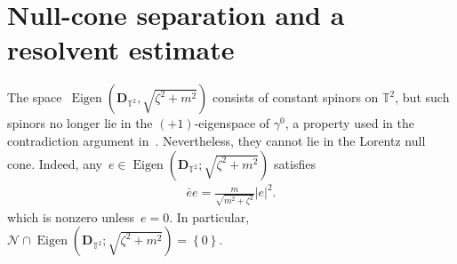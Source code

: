 \documentclass[11pt,final]{amsart}
\newcommand{\T}{\mathbb{T}}
\newcommand{\pD}{\mathbf{D}}
\newcommand{\braces}[1]{\left\{#1\right\}} %
\DeclareMathOperator{\Eigen}{Eigen}
\begin{document}
\section{Null-cone separation and a resolvent estimate}\label{sect:key lemma}

The space~$\Eigen(\pD_{\T^2}, \sqrt{\zeta^2+m^2})$ consists of constant spinors on $\mathbb{T}^2$, but such spinors no longer lie in the $(+1)$-eigenspace of $\gamma^0$, a property used in the contradiction argument in~\cite{WZ2026Stationary}.
Nevertheless, they cannot lie in the Lorentz null cone.  
Indeed, any~$e\in\Eigen(\pD_{\T^2};\sqrt{\zeta^2+m^2})$ satisfies
\begin{align}
    \bar{e}e=\frac{m}{\sqrt{m^2+\zeta^2}}|e|^2.
\end{align}
which is nonzero unless~$e=0$. 
In particular,~$\mathcal{N}\cap \Eigen(\pD_{\T^2};\sqrt{\zeta^2+m^2})=\braces{0}$.  
\end{document}
